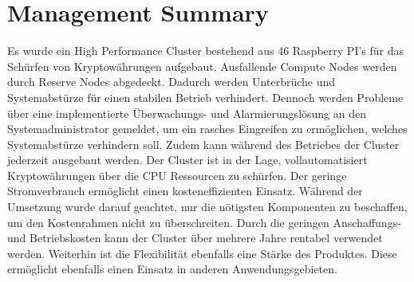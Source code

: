 \section*{Management Summary}
Es wurde ein High Performance Cluster bestehend aus 46 Raspberry PI's für das Schürfen von Kryptowährungen aufgebaut. Ausfallende Compute Nodes werden durch Reserve Nodes abgedeckt. Dadurch werden Unterbrüche und Systemabstürze für einen stabilen Betrieb verhindert. Dennoch werden Probleme über eine implementierte Überwachungs- und Alarmierungslösung an den Systemadministrator gemeldet, um ein rasches Eingreifen zu ermöglichen, welches Systemabstürze verhindern soll. Zudem kann während des Betriebes der Cluster jederzeit ausgebaut werden. Der Cluster ist in der Lage, vollautomatisiert Kryptowährungen über die CPU Ressourcen zu schürfen. Der geringe Stromverbrauch ermöglicht einen kosteneffizienten Einsatz. Während der Umsetzung wurde darauf geachtet, nur die nötigsten Komponenten zu beschaffen, um den Kostenrahmen nicht zu überschreiten. Durch die geringen Anschaffungs- und Betriebskosten kann der Cluster über mehrere Jahre rentabel verwendet werden. Weiterhin ist die Flexibilität ebenfalls eine Stärke des Produktes. Diese ermöglicht ebenfalls einen Einsatz in anderen Anwendungsgebieten.